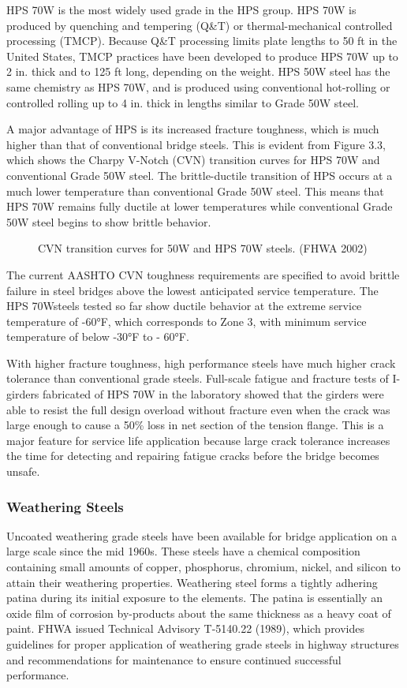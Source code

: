 HPS 70W is the most widely used grade in the HPS group. HPS 70W is produced by quenching and tempering
(Q\&T) or thermal-mechanical controlled processing (TMCP). Because Q\&T processing limits plate lengths to 50 ft
in the United States, TMCP practices have been developed to produce HPS 70W up to 2 in. thick and to 125 ft long,
depending on the weight. HPS 50W steel has the same chemistry as HPS 70W, and is produced using conventional
hot-rolling or controlled rolling up to 4 in. thick in lengths similar to Grade 50W steel.

A major advantage of HPS is its increased fracture toughness, which is much higher than that of conventional
bridge steels. This is evident from Figure 3.3, which shows the Charpy V-Notch (CVN) transition curves for HPS
70W and conventional Grade 50W steel. The brittle-ductile transition of HPS occurs at a much lower temperature
than conventional Grade 50W steel. This means that HPS 70W remains fully ductile at lower temperatures while
conventional Grade 50W steel begins to show brittle behavior.

\begin{figure}
  \caption{CVN transition curves for 50W and HPS 70W steels. (FHWA 2002)}\label{fig:transition-curves-steel}
\end{figure}

The current AASHTO CVN toughness requirements are specified to avoid brittle failure in steel bridges above
the lowest anticipated service temperature. The HPS 70Wsteels tested so far show ductile behavior at the extreme
service temperature of -60°F, which corresponds to Zone 3, with minimum service temperature of below -30°F to -
60°F.

With higher fracture toughness, high performance steels have much higher crack tolerance than conventional
grade steels. Full-scale fatigue and fracture tests of I-girders fabricated of HPS 70W in the laboratory showed that the
girders were able to resist the full design overload without fracture even when the crack was large enough to cause a
50\% loss in net section of the tension flange. This is a major feature for service life application because large crack
tolerance increases the time for detecting and repairing fatigue cracks before the bridge becomes unsafe.

\subsubsection{Weathering Steels}
Uncoated weathering grade steels have been available for bridge application on a large scale since the mid 1960s.
These steels have a chemical composition containing small amounts of copper, phosphorus, chromium, nickel, and
silicon to attain their weathering properties. Weathering steel forms a tightly adhering patina during its initial
exposure to the elements. The patina is essentially an oxide film of corrosion by-products about the same thickness as
a heavy coat of paint. FHWA issued Technical Advisory T-5140.22 (1989), which provides guidelines for proper
application of weathering grade steels in highway structures and recommendations for maintenance to ensure
continued successful performance.

